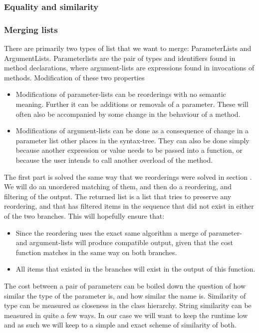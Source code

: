 \documentclass[11pt]{article}
\begin{document}
\subsubsection{Equality and similarity}
\label{FunctionSimilarity}

\subsubsection{Merging lists}
There are primarily two types of list that we want to merge: ParameterLists and ArgumentLists. Parameterlists are the pair of types and identifiers found in method declarations, where argument-lists are expressions found in invocations of methods. Modification of these two properties 

\begin{itemize}
   \item Modifications of parameter-lists can be reorderings with no semantic meaning. Further it can be additions or removals of a parameter. These will often also be accompanied by some change in the behaviour of a method.
   \item Modifications of argument-lists can be done as a consequence of change in a parameter list other places in the syntax-tree. They can also be done simply because another expression or value needs to be passed into a function, or because the user intends to call another overload of the method.
\end{itemize}

The first part is solved the same way that we reorderings were solved in section . We will do an unordered matching of them, and then do a reordering, and filtering of the output. The returned list is a list that tries to preserve any reordering, and that has filtered items in the sequence that did not exist in either of the two branches. This will hopefully ensure that:

\begin{itemize}
   \item Since the reordering uses the exact same algorithm a merge of parameter- and argument-lists will produce compatible output, given that the cost function matches in the same way on both branches.
   \item All items that existed in the branches will exist in the output of this function. 
\end{itemize}
The cost between a pair of parameters can be boiled down the question of how similar the type of the parameter is, and how similar the name is. Similarity of type can be measured as closeness in the class hierarchy. String similarity can be measured in quite a few ways. In our case we will want to keep the runtime low and as such we will keep to a simple and exact scheme of similarity of both.
\end{document}
